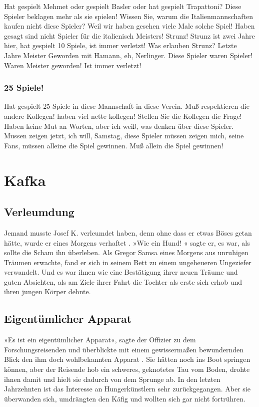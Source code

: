 \documentclass[ngerman, 11pt, a4paper]{article}
\begin{document}
  Hat gespielt Mehmet oder gespielt Basler oder hat gespielt Trapattoni? Diese Spieler beklagen mehr als sie spielen! Wissen Sie, warum die Italienmannschaften kaufen nicht diese Spieler? Weil wir haben gesehen viele Male solche Spiel! Haben gesagt sind nicht Spieler für die italienisch Meisters! Strunz! Strunz ist zwei Jahre hier, hat gespielt 10 Spiele, ist immer verletzt! Was erlauben Strunz? Letzte Jahre Meister Geworden mit Hamann, eh, Nerlinger. Diese Spieler waren Spieler! Waren Meister geworden! Ist immer verletzt!
  
  \subsubsection{25 Spiele!}
  
   Hat gespielt 25 Spiele in diese Mannschaft in diese Verein. Muß respektieren die andere Kollegen! haben viel nette kollegen! Stellen Sie die Kollegen die Frage! Haben keine Mut an Worten, aber ich weiß, was denken über diese Spieler. Mussen zeigen jetzt, ich will, Samstag, diese Spieler müssen zeigen mich, seine Fans, müssen alleine die Spiel gewinnen. Muß allein die Spiel gewinnen!
   
\section{Kafka}

\subsection{Verleumdung}

Jemand musste Josef K. verleumdet haben, denn ohne dass er etwas Böses getan hätte, wurde er eines Morgens verhaftet \parencite{mitrednf2021}. »Wie ein Hund! « sagte er, es war, als sollte die Scham ihn überleben. Als Gregor Samsa eines Morgens aus unruhigen Träumen erwachte, fand er sich in seinem Bett zu einem ungeheueren Ungeziefer verwandelt. Und es war ihnen wie eine Bestätigung ihrer neuen Träume und guten Absichten, als am Ziele ihrer Fahrt die Tochter als erste sich erhob und ihren jungen Körper dehnte.

\subsection{Eigentümlicher Apparat}

 »Es ist ein eigentümlicher Apparat«, sagte der Offizier zu dem Forschungsreisenden und überblickte mit einem gewissermaßen bewundernden Blick den ihm doch wohlbekannten Apparat \parencite[182-185]{syme2011f}. Sie hätten noch ins Boot springen können, aber der Reisende hob ein schweres, geknotetes Tau vom Boden, drohte ihnen damit und hielt sie dadurch von dem Sprunge ab. In den letzten Jahrzehnten ist das Interesse an Hungerkünstlern sehr zurückgegangen. Aber sie überwanden sich, umdrängten den Käfig und wollten sich gar nicht fortrühren. 
 
\end{document}
